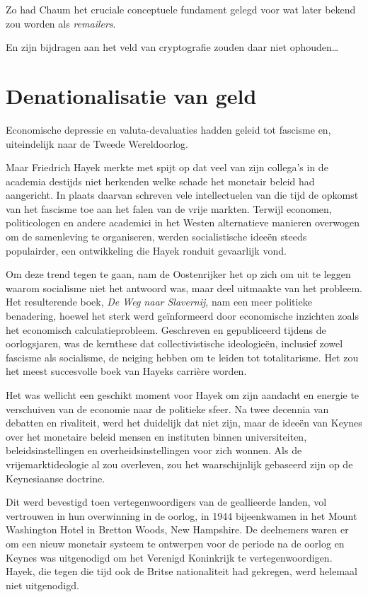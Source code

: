\documentclass[
  a5paper,
  smalldemyvopaper,11pt,twoside,onecolumn,openright,extrafontsizes,
hidelinks]{memoir}
\begin{document}
Zo had Chaum het cruciale conceptuele fundament gelegd voor wat later
bekend zou worden als \emph{remailers}.

En zijn bijdragen aan het veld van cryptografie zouden daar niet
ophouden\ldots{}

\chapter{Denationalisatie van geld}\label{denationalisatie-van-geld}

Economische depressie en valuta-devaluaties hadden geleid tot fascisme
en, uiteindelijk naar de Tweede Wereldoorlog.

Maar Friedrich Hayek merkte met spijt op dat veel van zijn collega's in
de academia destijds niet herkenden welke schade het monetair beleid had
aangericht. In plaats daarvan schreven vele intellectuelen van die tijd
de opkomst van het fascisme toe aan het falen van de vrije markten.
Terwijl economen, politicologen en andere academici in het Westen
alternatieve manieren overwogen om de samenleving te organiseren, werden
socialistische ideeën steeds populairder, een ontwikkeling die Hayek
ronduit gevaarlijk vond.

Om deze trend tegen te gaan, nam de Oostenrijker het op zich om uit te
leggen waarom socialisme niet het antwoord was, maar deel uitmaakte van
het probleem. Het resulterende boek, \emph{De Weg naar Slavernij}, nam
een meer politieke benadering, hoewel het sterk werd geïnformeerd door
economische inzichten zoals het economisch calculatieprobleem.
Geschreven en gepubliceerd tijdens de oorlogsjaren, was de kernthese dat
collectivistische ideologieën, inclusief zowel fascisme als socialisme,
de neiging hebben om te leiden tot totalitarisme. Het zou het meest
succesvolle boek van Hayeks carrière worden.

Het was wellicht een geschikt moment voor Hayek om zijn aandacht en
energie te verschuiven van de economie naar de politieke sfeer. Na twee
decennia van debatten en rivaliteit, werd het duidelijk dat niet zijn,
maar de ideeën van Keynes over het monetaire beleid mensen en instituten
binnen universiteiten, beleidsinstellingen en overheidsinstellingen voor
zich wonnen. Als de vrijemarktideologie al zou overleven, zou het
waarschijnlijk gebaseerd zijn op de Keynesiaanse doctrine.

Dit werd bevestigd toen vertegenwoordigers van de geallieerde landen,
vol vertrouwen in hun overwinning in de oorlog, in 1944 bijeenkwamen in
het Mount Washington Hotel in Bretton Woods, New Hampshire. De
deelnemers waren er om een nieuw monetair systeem te ontwerpen voor de
periode na de oorlog en Keynes was uitgenodigd om het Verenigd
Koninkrijk te vertegenwoordigen. Hayek, die tegen die tijd ook de Britse
nationaliteit had gekregen, werd helemaal niet uitgenodigd.
\end{document}

